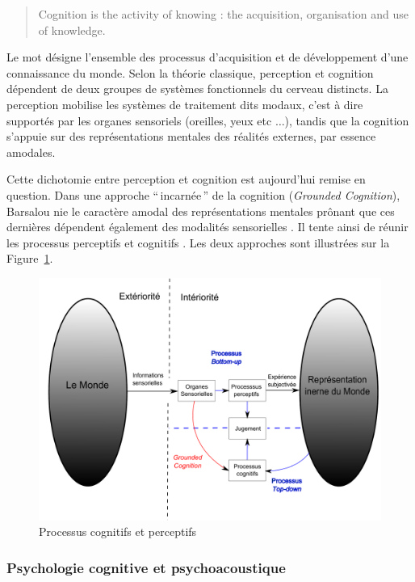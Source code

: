\begin{quote}
Cognition is the activity of knowing : the acquisition, organisation and use of knowledge.
\end{quote}

Le mot désigne l'ensemble des processus d'acquisition et de développement d'une connaissance du monde. 
Selon la théorie classique, perception et cognition dépendent de deux groupes de systèmes fonctionnels du cerveau distincts. La perception mobilise les systèmes de traitement dits modaux, c'est à dire supportés par les organes sensoriels (oreilles, yeux etc $\ldots$), tandis que la cognition s'appuie sur des représentations mentales des réalités externes, par essence amodales.
 

Cette dichotomie entre perception et cognition est aujourd'hui remise en question. Dans une approche ``\,incarnée\,'' de la cognition (\emph{Grounded Cognition}), Barsalou nie le caractère amodal des représentations mentales prônant que ces dernières dépendent également des modalités sensorielles \citep{barsalou2010grounded}. Il tente ainsi de réunir les processus perceptifs et cognitifs \citep{goldstone1998reuniting, barsalou1999perceptions}.
Les deux approches sont illustrées sur la Figure~\ref{fig:processusPercepAndCo}.

\begin{figure}[bth]
        \myfloatalign
        \includegraphics[width=\linewidth]{gfx/Representation}
        \caption{Processus cognitifs et perceptifs}\label{fig:processusPercepAndCo}
\end{figure}

\subsubsection{Psychologie cognitive et psychoacoustique}

